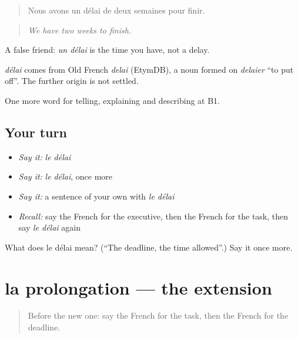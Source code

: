 \begin{quote}
Nous avons un délai de deux semaines pour finir.
\end{quote}

\begin{quote}
\emph{We have two weeks to finish.}
\end{quote}

A false friend: \emph{un délai} is the time you have, not a delay.

\begin{cousinweb}
\emph{délai} comes from Old French \emph{delai} (EtymDB), a noun formed on \emph{delaier} \textquotedblleft{}to put off\textquotedblright{}. The further origin is not settled.
\end{cousinweb}

\begin{grammarlens}[title={What you've built}]
One more word for telling, explaining and describing at B1.
\end{grammarlens}

\subsection*{Your turn}
\begin{itemize}
\raggedright
  \item \emph{Say it:} \emph{le délai}
  \item \emph{Say it:} \emph{le délai}, once more
  \item \emph{Say it:} a sentence of your own with \emph{le délai}
  \item \emph{Recall:} say the French for the executive, then the French for the task, then say \emph{le délai} again
\end{itemize}

\begin{tcolorbox}[breakable,colback=teal!4,colframe=teal!35!black,title={Before you move on}]
What does le délai mean? (\textquotedblleft{}The deadline, the time allowed\textquotedblright{}.) Say it once more.
\end{tcolorbox}
\section[la prolongation]{la prolongation — the extension}

\label{lesson:FR-C359-prolongation}



\begin{quote}
Before the new one: say the French for the task, then the French for the deadline.
\end{quote}

